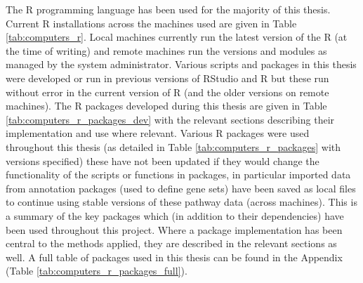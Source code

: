 The R programming language has been used for the majority of this thesis. Current R installations across the machines used are given in Table \ref{tab:computers_r}. Local machines currently run the latest version of the R (at the time of writing) and remote machines run the versions and modules as managed by the system administrator. Various scripts and packages in this thesis were developed or run in previous versions of RStudio and R but these run without error in the current version of R (and the older versions on remote machines). The R packages developed during this thesis are given in Table \ref{tab:computers_r_packages_dev} with the relevant sections describing their implementation and use where relevant. Various R packages were used throughout this thesis (as detailed in Table \ref{tab:computers_r_packages} with versions specified) these have not been updated if they would change the functionality of the scripts or functions in packages, in particular imported data from annotation packages (used to define gene sets) have been saved as local files to continue using stable versions of these pathway data (across machines). This is a summary of the key packages which (in addition to their dependencies) have been used throughout this project. Where a package implementation has been central to the methods applied, they are described in the relevant sections as well. A full table of packages used in this thesis can be found in the Appendix (Table \ref{tab:computers_r_packages_full}).  

\setlength{\LTleft}{-20cm plus -1fill}
\setlength{\LTright}{\LTleft}

